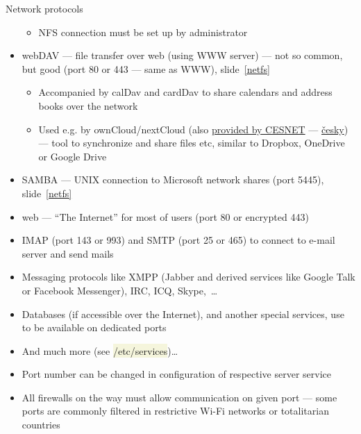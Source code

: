 \documentclass[compress, ucs, xelatex, 11pt, xcolor=svgnames, aspectratio=169,
	hyperref={
		bookmarks=true,
		unicode=true,
		colorlinks=true,
		pdftitle={Linux, command line and MetaCentrum},
		plainpages=false,
		pdfauthor={Vojtech Zeisek},
		pdfsubject={Course about use of Linux command line, writing shell scripts and using MetaCentrum of CESNET},
		pdfcreator={XeLaTeX},
		pdfkeywords={Linux, GNU, BASH, shell, command line, MetaCentrum},
		linkcolor=DarkRed, %
		anchorcolor=DarkBlue, %
		citecolor=Indigo, %
		filecolor=NavyBlue, %
		menucolor=DarkMagenta, %
		urlcolor=DarkBlue, %
		pdftex},
	url={hyphens, lowtilde} %
	]{beamer}
\renewcommand{\texttt}[1]{\colorbox{Beige}{{\ttfamily #1}}}
\begin{document}
\begin{frame}[allowframebreaks]{Network protocols}
\begin{itemize}
		\begin{itemize}
			\item NFS connection must be set up by administrator
		\end{itemize}
		\item webDAV --- file transfer over web (using WWW server) --- not so common, but good (port 80 or 443 --- same as WWW), slide~\ref{netfs}
		\begin{itemize}
			\item Accompanied by calDav and cardDav to share calendars and address books over the network
			\item Used e.g. by ownCloud/nextCloud (also \href{https://du.cesnet.cz/en/navody/owncloud/start}{provided by CESNET} --- \href{https://du.cesnet.cz/cs/navody/owncloud/start}{česky}) --- tool to synchronize and share files etc, similar to Dropbox, OneDrive or Google Drive
		\end{itemize}
		\item SAMBA --- UNIX connection to Microsoft network shares (port 5445), slide~\ref{netfs}
		\item web --- \enquote{The Internet} for most of users (port 80 or encrypted 443)
		\item IMAP (port 143 or 993) and SMTP (port 25 or 465) to connect to e-mail server and send mails
		\item Messaging protocols like XMPP (Jabber and derived services like Google Talk or Facebook Messenger), IRC, ICQ, Skype,~\ldots
		\item Databases (if accessible over the Internet), and another special services, use to be available on dedicated ports
		\item And much more (see \texttt{/etc/services})\ldots
		\item Port number can be changed in configuration of respective server service
		\item All firewalls on the way must allow communication on given port --- some ports are commonly filtered in restrictive Wi-Fi networks or totalitarian countries
	\end{itemize}
\end{frame}
\end{document}
